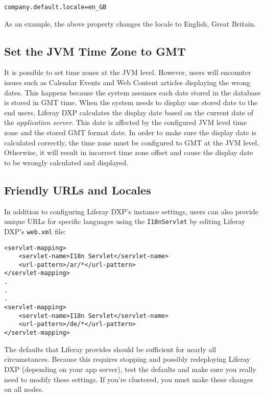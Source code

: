 \begin{verbatim}
company.default.locale=en_GB
\end{verbatim}

As an example, the above property changes the locale to English, Great
Britain.

\subsection{Set the JVM Time Zone to
GMT}\label{set-the-jvm-time-zone-to-gmt}

It is possible to set time zones at the JVM level. However, users will
encounter issues such as Calendar Events and Web Content articles
displaying the wrong dates. This happens because the system assumes each
date stored in the database is stored in GMT time. When the system needs
to display one stored date to the end users, Liferay DXP calculates the
display date based on the current date of the \emph{application server}.
This date is affected by the configured JVM level time zone and the
stored GMT format date. In order to make sure the display date is
calculated correctly, the time zone must be configured to GMT at the JVM
level. Otherwise, it will result in incorrect time zone offset and cause
the display date to be wrongly calculated and displayed.

\subsection{Friendly URLs and
Locales}\label{friendly-urls-and-locales}

In addition to configuring Liferay DXP's instance settings, users can
also provide unique URLs for specific languages using the
\texttt{I18nServlet} by editing Liferay DXP's \texttt{web.xml} file:

\begin{verbatim}
<servlet-mapping>
    <servlet-name>I18n Servlet</servlet-name>
    <url-pattern>/ar/*</url-pattern>
</servlet-mapping>
.
.
.
<servlet-mapping>
    <servlet-name>I18n Servlet</servlet-name>
    <url-pattern>/de/*</url-pattern>
</servlet-mapping>
\end{verbatim}

The defaults that Liferay provides should be sufficient for nearly all
circumstances. Because this requires stopping and possibly redeploying
Liferay DXP (depending on your app server), test the defaults and make
sure you really need to modify these settings. If you're clustered, you
must make these changes on all nodes.

